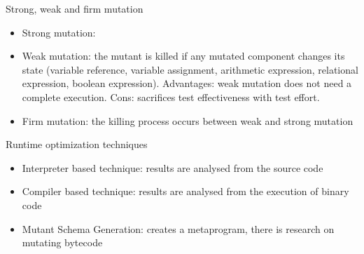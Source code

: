 Strong, weak and firm mutation
\begin{itemize}
	\item Strong mutation:
	\item Weak mutation: the mutant is killed if any mutated component changes its state (variable reference, variable assignment, arithmetic expression, relational expression, boolean expression). Advantages: weak mutation does not need a complete execution. Cons: sacrifices test effectiveness with test effort.
	\item Firm mutation: the killing process occurs between weak and strong mutation
\end{itemize} 

Runtime optimization techniques
\begin{itemize}
	\item Interpreter based technique: results are analysed from the source code
	\item Compiler based technique: results are analysed from the execution of binary code 
	\item Mutant Schema Generation: creates a metaprogram, there is research on mutating bytecode
\end{itemize}



